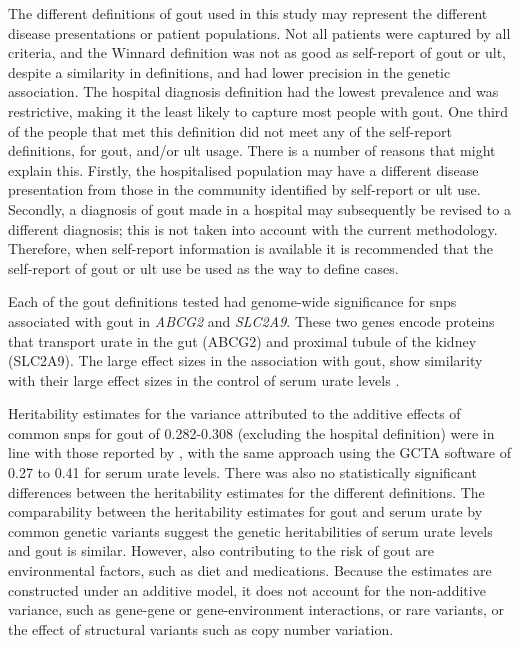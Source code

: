 \documentclass[twoside,openright]{report}
\begin{document}
The different definitions of gout used in this study may represent the
different disease presentations or patient populations. Not all patients
were captured by all criteria, and the Winnard definition was not as
good as self-report of gout or \gls{ult}, despite a similarity in
definitions, and had lower precision in the genetic association. The
hospital diagnosis definition had the lowest prevalence and was
restrictive, making it the least likely to capture most people with
gout. One third of the people that met this definition did not meet any
of the self-report definitions, for gout, and/or \gls{ult} usage. There
is a number of reasons that might explain this. Firstly, the
hospitalised population may have a different disease presentation from
those in the community identified by self-report or \gls{ult} use.
Secondly, a diagnosis of gout made in a hospital may subsequently be
revised to a different diagnosis; this is not taken into account with
the current methodology. Therefore, when self-report information is
available it is recommended that the self-report of gout or \gls{ult}
use be used as the way to define cases.

Each of the gout definitions tested had genome-wide significance for
\glspl{snp} associated with gout in \emph{ABCG2} and \emph{SLC2A9}.
These two genes encode proteins that transport urate in the gut (ABCG2)
and proximal tubule of the kidney (SLC2A9). The large effect sizes in
the association with gout, show similarity with their large effect sizes
in the control of serum urate levels \citep{Kottgen2013}.

Heritability estimates for the variance attributed to the additive
effects of common \glspl{snp} for gout of 0.282-0.308 (excluding the
hospital definition) were in line with those reported by
\citet{Kottgen2013}, with the same approach using the GCTA software of
0.27 to 0.41 for serum urate levels. There was also no statistically
significant differences between the heritability estimates for the
different definitions. The comparability between the heritability
estimates for gout and serum urate by common genetic variants suggest
the genetic heritabilities of serum urate levels and gout is similar.
However, also contributing to the risk of gout are environmental
factors, such as diet and medications. Because the estimates are
constructed under an additive model, it does not account for the
non-additive variance, such as gene-gene or gene-environment
interactions, or rare variants, or the effect of structural variants
such as copy number variation.
\end{document}
